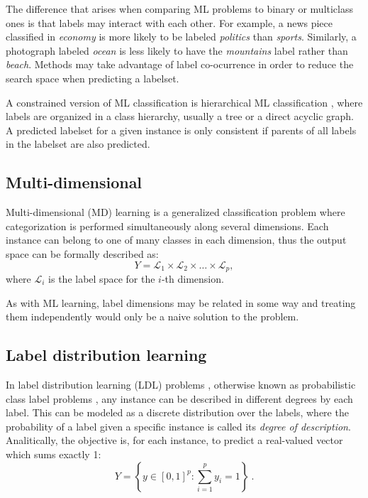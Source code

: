 The difference that arises when comparing ML problems to binary or multiclass ones is that labels may interact with each other. For example, a news piece classified in \emph{economy} is more likely to be labeled \emph{politics} than \emph{sports}. Similarly, a photograph labeled \emph{ocean} is less likely to have the \emph{mountains} label rather than \emph{beach}. Methods may take advantage of label co-ocurrence  in order to reduce the search space when predicting a labelset. 


  A constrained version of ML classification is hierarchical ML classification , where labels are organized in a class hierarchy, usually a tree or a direct acyclic graph. A predicted labelset for a given instance is only consistent if parents of all labels in the labelset are also predicted.
  

\subsection{Multi-dimensional}
\label{p3sec:mdim}

Multi-dimensional (MD) learning  is a generalized classification problem where categorization is performed simultaneously along several dimensions. Each instance can belong to one of many classes in each dimension, thus the output space can be formally described as:
\begin{equation}
  Y=\mathcal L_1\times\mathcal L_2\times\dots\times\mathcal L_p,
  \end{equation}
where $\mathcal L_i$ is the label space for the $i$-th dimension. 

As with ML learning, label dimensions may be related in some way and treating them independently would only be a naive solution to the problem.

\subsection{Label distribution learning}
\label{p3sec:ldl}

In label distribution learning (LDL) problems , otherwise known as probabilistic class label problems , any instance can be described in different degrees by each label. This can be modeled as a discrete distribution over the labels, where the probability of a label given a specific instance is called its \emph{degree of description}. Analitically, the objective is, for each instance, to predict a real-valued vector which sums exactly 1:
\begin{equation}
  Y=\left\{y\in\left[0,1\right]^p:\sum_{i=1}^p y_i = 1\right\}~.
  \end{equation}
  
